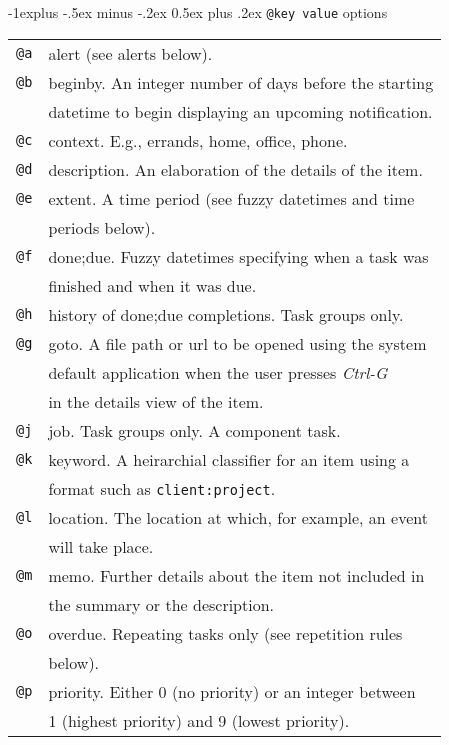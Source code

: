 \documentclass[9pt,landscape]{article}
\makeatletter
\renewcommand{\subsection}{\@startsection{subsection}{2}{0mm}%
                                {-1explus -.5ex minus -.2ex}%
                                {0.5ex plus .2ex}%
                                {\normalfont\normalsize\bfseries}}
\makeatother
\begin{document}
\begin{multicols}{3}
\subsection{\texttt{@key value} options}
\newlength{\MyLen}
\begin{tabular}{@{}ll@{}}
\texttt{@a} & alert (see alerts below). \\
\texttt{@b} & beginby. An integer number of days before the starting \\
            & datetime to begin displaying an upcoming notification. \\
\texttt{@c} & context. E.g., errands, home, office, phone. \\
\texttt{@d} & description. An elaboration of the details of the item. \\
\texttt{@e} & extent. A time period (see fuzzy datetimes and time \\
            & periods below).\\
\texttt{@f} & done;due. Fuzzy datetimes specifying when a task was \\
            & finished and when it was due. \\
\texttt{@h} & history of done;due completions. Task groups only. \\
\texttt{@g} & goto. A file path or url to be opened using the system \\
            & default application when the user presses \emph{Ctrl-G} \\
            & in the details view of the item. \\
\texttt{@j} & job. Task groups only. A component task. \\
\texttt{@k} & keyword. A heirarchial classifier for an item using a \\
            & format such as \texttt{client:project}. \\
\texttt{@l} & location. The location at which, for example, an event \\
            & will take place. \\
\texttt{@m} & memo. Further details about the item not included in \\
            & the summary or the description. \\
\texttt{@o} & overdue. Repeating tasks only (see repetition rules \\
            & below). \\
\texttt{@p} & priority. Either 0 (no priority) or an integer between \\
            & 1 (highest priority) and 9 (lowest priority). \\
\end{tabular}


\end{multicols}
\end{document}
